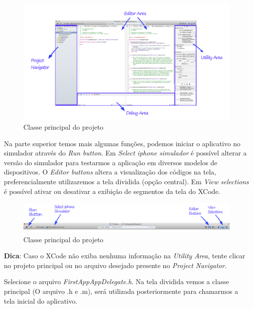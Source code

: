\documentclass[a4paper,12pt,brazil,doubleside]{book}
\begin{document}
\begin{singlespace}
\begin{figure}[H]
  \centering
  \includegraphics[width=.99\textwidth]{figuras/3/tela_principal_xcode.png}
  \caption{Classe principal do projeto}
  \label{fig:a}
\end{figure}


Na parte superior temos mais algumas funções, podemos iniciar o aplicativo no simulador através do \emph{Run button}. Em \emph{Select iphone simulador} é possível alterar a versão do simulador para testarmos a aplicação em diversos modelos de dispositivos. O \emph{Editor buttons} altera a visualização dos códigos na tela, preferencialmente utilizaremos a tela dividida (opção central). Em \emph{View selections} é possível ativar ou desativar a exibição de segmentos da tela do XCode.

\begin{figure}[H]
  \centering
  \includegraphics[width=.85\textwidth]{figuras/3/tela_principal_xcode_run.png}
  \caption{Classe principal do projeto}
  \label{fig:a}
\end{figure}

\begin{framed}

\textbf{Dica}: Caso o XCode não exiba nenhuma informação na
\textit{Utility Area}, tente clicar no projeto principal ou no arquivo desejado presente no \textit{Project Navigator}.
\end{framed}


 Selecione o arquivo \emph{FirstAppAppDelegate.h}. Na tela dividida vemos a classe principal (O arquivo .h e .m), será utilizada posteriormente para chamarmos a tela inicial do aplicativo.


\end{singlespace}
\end{document}
